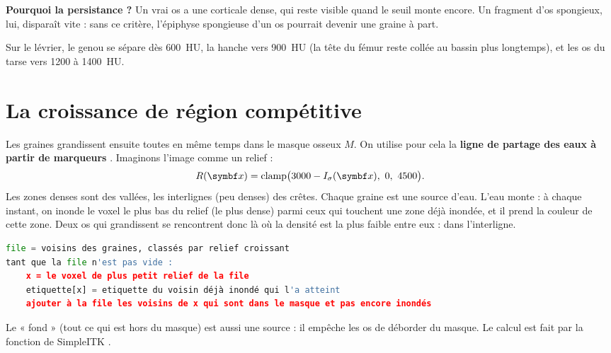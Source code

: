 \begin{pourquoi}
\textbf{Pourquoi la persistance ?} Un vrai os a une corticale dense, qui reste visible quand le seuil monte encore. Un
fragment d'os spongieux, lui, disparaît vite : sans ce critère, l'épiphyse spongieuse d'un os pourrait devenir une
graine à part.
\end{pourquoi}

\begin{exemple}
Sur le lévrier, le genou se sépare dès 600~HU, la hanche vers 900~HU (la tête du fémur reste collée au bassin plus
longtemps), et les os du tarse vers 1200 à 1400~HU.
\end{exemple}

\section{La croissance de région compétitive}
\label{sec:croissance}

Les graines grandissent ensuite toutes en même temps dans le masque osseux $M$. On utilise pour cela la
\textbf{ligne de partage des eaux à partir de marqueurs} \cite{meyer1994}. Imaginons l'image comme un relief :
\begin{equation}
  R(\vb{x}) = \clamp\bigl(3000 - I_\sigma(\vb{x}),\ 0,\ 4500\bigr).
\end{equation}
Les zones denses sont des vallées, les interlignes (peu denses) des crêtes. Chaque graine est une source d'eau. L'eau
monte : à chaque instant, on inonde le voxel le plus bas du relief (le plus dense) parmi ceux qui touchent une zone
déjà inondée, et il prend la couleur de cette zone. Deux os qui grandissent se rencontrent donc là où la densité est
la plus faible entre eux : dans l'interligne.

\noindent\begin{minipage}{\linewidth}
\begin{lstlisting}[language=Python, title={Principe (pseudo-code)}]
file = voisins des graines, classés par relief croissant
tant que la file n'est pas vide :
    x = le voxel de plus petit relief de la file
    etiquette[x] = etiquette du voisin déjà inondé qui l'a atteint
    ajouter à la file les voisins de x qui sont dans le masque et pas encore inondés
\end{lstlisting}
\end{minipage}

Le « fond » (tout ce qui est hors du masque) est aussi une source : il empêche les os de déborder du masque. Le calcul
est fait par la fonction  de SimpleITK \cite{lowekamp2013}.

